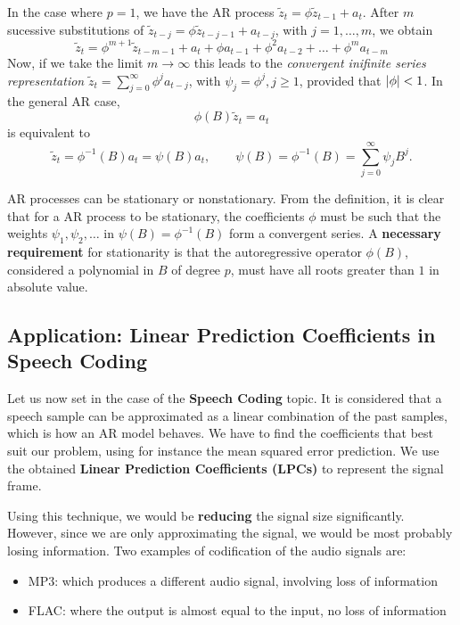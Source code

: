   In the case where \(p=1\), we have the AR process \(\tilde z_{t} = \phi \tilde z_{t-1} + a_{t}\). After \(m\) sucessive substitutions of \(\tilde z_{t-j} = \phi \tilde z_{t-j-1} + a_{t-j} \), with \(j = 1,\dots,m\), we obtain
  \[
    \tilde z_{t} = \phi^{m+1}\tilde z_{t-m-1}+ a_{t} + \phi a_{t-1} + \phi^{2}a_{t-2} + \dots + \phi^{m}a_{t-m}
  \]
  Now, if we take the limit \(m\to \infty\) this leads to the \emph{convergent inifinite series representation} \(\tilde z_{t} = \sum_{j=0}^{\infty}\phi^{j}a_{t-j}\), with \(\psi_{j} = \phi^{j}, j \geq 1\), provided that \(\left\lvert \phi \right\rvert < 1\). In the general AR case,
  \[
    \phi(B) \tilde z_{t} = a_{t}
  \]
  is equivalent to
  \[
    \tilde z_{t} = \phi^{-1}(B) a_{t} = \psi(B)a_{t}, \quad \quad \psi(B) = \phi^{-1}(B) = \sum_{j=0}^{\infty}\psi_{j}B^{j}.
  \]

  AR processes can be stationary or nonstationary. From the definition, it is clear that for a AR process to be stationary, the coefficients \(\phi\) must be such that the weights \(\psi_{1},\psi_{2},\dots\) in \(\psi(B) = \phi^{-1}(B)\) form a convergent series. A \textbf{necessary requirement} for stationarity is that the autoregressive operator \(\phi(B)\), considered a polynomial in \(B\) of degree \(p\), must have all roots greater than \(1\) in absolute value.

  \subsection{Application: Linear Prediction Coefficients in Speech Coding}


  Let us now set in the case of the \textbf{Speech Coding} topic. It is considered that a speech sample can be approximated as a linear combination of the past samples, which is how an AR model behaves. We have to find the coefficients that best suit our problem, using for instance the mean squared error prediction. We use the obtained \textbf{Linear Prediction Coefficients (LPCs)} to represent the signal frame.

  Using this technique, we would be \textbf{reducing} the signal size significantly. However, since we are only approximating the signal, we would be most probably losing information. Two examples of codification of the audio signals are:

  \begin{itemize}
    \item MP3: which produces a different audio signal, involving loss of information
          \item FLAC: where the output is almost equal to the input, no loss of information
\end{itemize}


